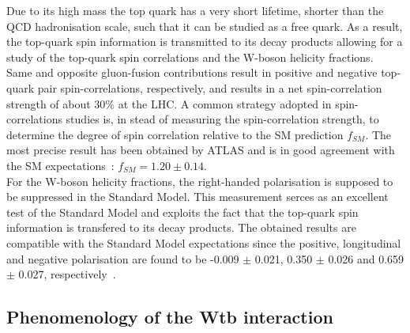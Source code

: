 Due to its high mass the top quark has a very short lifetime, shorter than the QCD hadronisation scale, such that it can be studied as a free quark. As a result, the top-quark spin information is transmitted to its decay products allowing for a study of the top-quark spin correlations and the W-boson helicity fractions.
\\
Same and opposite gluon-fusion contributions result in positive and negative top-quark pair spin-correlations, respectively, and results in a net spin-correlation strength of about $30 \%$ at the LHC.
A common strategy adopted in spin-correlations studies is, in stead of measuring the spin-correlation strength, to determine the degree of spin correlation relative to the SM prediction $f_{SM}$. 
The most precise result has been obtained by ATLAS and is in good agreement with the SM expectations~\cite{AtlasSpinCorr}: $f_{SM} = 1.20 \pm 0.14$.
\\
For the W-boson helicity fractions, the right-handed polarisation is supposed to be suppressed in the Standard Model.
This measurement serces as an excellent test of the Standard Model and exploits the fact that the top-quark spin information is transfered to its decay products.
The obtained results are compatible with the Standard Model expectations since the positive, longitudinal and negative polarisation are found to be -0.009 $\pm$ 0.021, 0.350 $\pm$ 0.026 and 0.659 $\pm$ 0.027, respectively~\cite{CMSWHelicity}.

\subsection{Phenomenology of the Wtb interaction} \label{sec::SubWtb}



